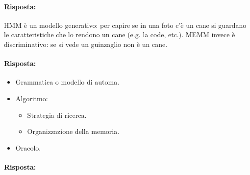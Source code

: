 \paragraph{Risposta:} HMM è un modello generativo: per capire se in una foto c'è un cane si guardano le caratteristiche che lo rendono un cane (e.g. la code, etc.). MEMM invece è discriminativo: se si vede un guinzaglio non è un cane. 


\paragraph{Risposta:}

\begin{itemize}
  \item Grammatica o modello di automa. 
  \item Algoritmo:
    \begin{itemize}
      \item Strategia di ricerca. 
      \item Organizzazione della memoria.
    \end{itemize}
  \item Oracolo.
\end{itemize}


\paragraph{Risposta:}

